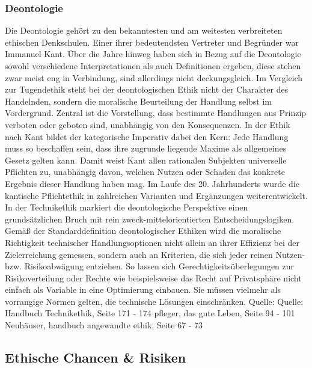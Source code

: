 \subsubsection{Deontologie}
Die Deontologie gehört zu den bekanntesten und am weitesten verbreiteten ethischen Denkschulen. Einer ihrer bedeutendsten Vertreter und Begründer war Immanuel Kant. Über die Jahre hinweg haben sich in Bezug auf die Deontologie sowohl verschiedene Interpretationen als auch Definitionen ergeben, diese stehen zwar meist eng in Verbindung, sind allerdings nicht deckungsgleich. Im Vergleich zur Tugendethik steht bei der deontologischen Ethik nicht der Charakter des Handelnden, sondern die moralische Beurteilung der Handlung selbst im Vordergrund. Zentral ist die Vorstellung, dass bestimmte Handlungen aus Prinzip verboten oder geboten sind, unabhängig von den Konsequenzen. In der Ethik nach Kant bildet der kategorische Imperativ dabei den Kern: Jede Handlung muss so beschaffen sein, dass ihre zugrunde liegende Maxime als allgemeines Gesetz gelten kann. Damit weist Kant allen rationalen Subjekten universelle Pflichten zu, unabhängig davon, welchen Nutzen oder Schaden das konkrete Ergebnis dieser Handlung haben mag. Im Laufe des 20. Jahrhunderts wurde die kantische Pflichtethik in zahlreichen Varianten und Ergänzungen weiterentwickelt. In der Technikethik markiert die deontologische Perspektive einen grundsätzlichen Bruch mit rein zweck-mittelorientierten Entscheidungslogiken. Gemäß der Standarddefinition deontologischer Ethiken wird die moralische Richtigkeit technischer Handlungsoptionen nicht allein an ihrer Effizienz bei der Zielerreichung gemessen, sondern auch an Kriterien, die sich jeder reinen Nutzen- bzw. Risikoabwägung entziehen. So lassen sich Gerechtigkeitsüberlegungen zur Risikoverteilung oder Rechte wie beispielsweise das Recht auf Privatsphäre nicht einfach als Variable in eine Optimierung einbauen. Sie müssen vielmehr als vorrangige Normen gelten, die technische Lösungen einschränken. \cite{}
Quelle: Quelle: Handbuch Technikethik, Seite 171 - 174
pfleger, das gute Leben, Seite 94 - 101
Neuhäuser, handbuch angewandte ethik, Seite 67 - 73

\subsection{Ethische Chancen \& Risiken}

